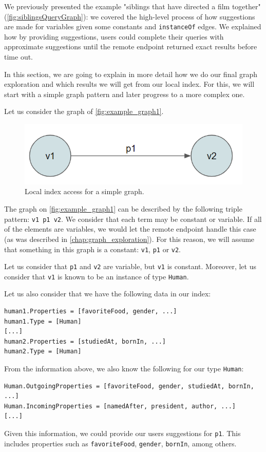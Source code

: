 We previously presented the example  "siblings that have directed a film together" (\autoref{fig:siblingsQueryGraph}): we covered the high-level process of how suggestions are made for variables given some constants and \texttt{instanceOf} edges. We explained how by providing suggestions, users could complete their queries with approximate suggestions until the remote endpoint returned exact results before time out. 

In this section, we are going to explain in more detail how we do our final graph exploration and which results we will get from our local index. For this, we will start with a simple graph pattern and later progress to a more complex one.

\begin{example}
Let us consider the graph of \autoref{fig:example_graph1}.

\begin{figure}[H]
    \centering
        \includegraphics[width=0.5\linewidth]{imagenes/graph1.png}
        \caption{Local index access for a simple graph.}
        \label{fig:example_graph1}
\end{figure}

The graph on \autoref{fig:example_graph1} can be described by the following triple pattern: \texttt{v1 p1 v2}. We consider that each term may be constant or variable. If all of the elements are variables, we would let the remote endpoint handle this case (as was described in \autoref{chap:graph_exploration}). For this reason, we will assume that something in this graph is a constant: \texttt{v1}, \texttt{p1} or \texttt{v2}.

Let us consider that \texttt{p1} and \texttt{v2} are variable, but \texttt{v1} is constant. Moreover, let us consider that \texttt{v1} is known to be an instance of type \texttt{Human}.

Let us also consider that we have the following data in our index:
\begin{verbatim}
human1.Properties = [favoriteFood, gender, ...]
human1.Type = [Human]
[...]
human2.Properties = [studiedAt, bornIn, ...]
human2.Type = [Human]
\end{verbatim}

From the information above, we also know the following for our type \texttt{Human}:
\begin{verbatim}
Human.OutgoingProperties = [favoriteFood, gender, studiedAt, bornIn, ...]
Human.IncomingProperties = [namedAfter, president, author, ...]
[...]
\end{verbatim}

Given this information, we could provide our users suggestions for \texttt{p1}. This includes properties such as \texttt{favoriteFood}, \texttt{gender}, \texttt{bornIn}, among others.

\end{example}

